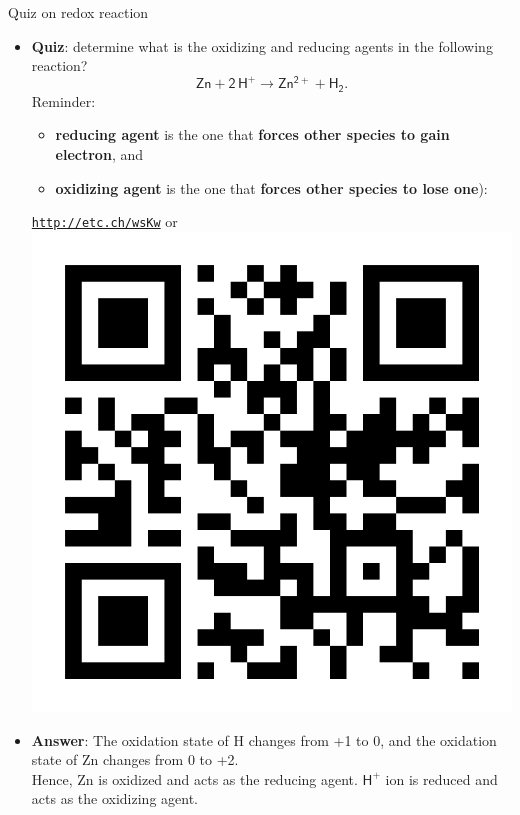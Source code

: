 %		
%	
%
%
\begin{frame}{Quiz on redox reaction}
	\begin{itemize}
		\item \alert{\textbf{Quiz}}: determine what is the oxidizing and reducing agents in the following reaction?
		\[
		\mathsf{Zn + 2\, H^+ \rightarrow  Zn^{2+} + H_2}.
		\]
		Reminder: 
			\begin{itemize}
				\item \textbf{reducing agent} is the one that \textbf{forces other species to gain electron}, and 
				\item \textbf{oxidizing agent}  is the one that \textbf{forces other species to lose one}):
			\end{itemize}
		
		\begin{center}
			\href{http://etc.ch/wsKw}{\textcolor{indigo(dye)}{\tt http://etc.ch/wsKw}} \quad or \quad
			\includegraphics[height=0.15\columnwidth]{figures/chemical-kinetics/polls.png}
		\end{center}
		\hiddenpause
		\item {\textbf{Answer}}: The oxidation state of H changes from +1 to 0, and the oxidation state of  Zn  changes from 0 to +2. \\
		Hence,  Zn  is oxidized and acts as the reducing agent.  $\mathsf{H^+}$  ion is reduced and acts as the oxidizing agent.
		
	\end{itemize}
	
\end{frame}


